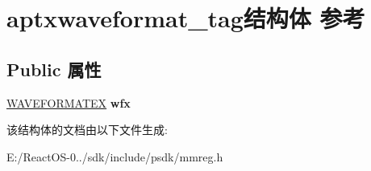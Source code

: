 \hypertarget{structaptxwaveformat__tag}{}\section{aptxwaveformat\+\_\+tag结构体 参考}
\label{structaptxwaveformat__tag}
\subsection*{Public 属性}
\begin{DoxyCompactItemize}
\item 
\mbox{\label{structaptxwaveformat__tag_ac4dde389c546cdd6a0575b84de10074f}} 
\hyperlink{struct_w_a_v_e_f_o_r_m_a_t_e_x}{W\+A\+V\+E\+F\+O\+R\+M\+A\+T\+EX} {\bfseries wfx}
\end{DoxyCompactItemize}


该结构体的文档由以下文件生成\+:\begin{DoxyCompactItemize}
\item 
E\+:/\+React\+O\+S-\/0../sdk/include/psdk/mmreg.\+h\end{DoxyCompactItemize}
